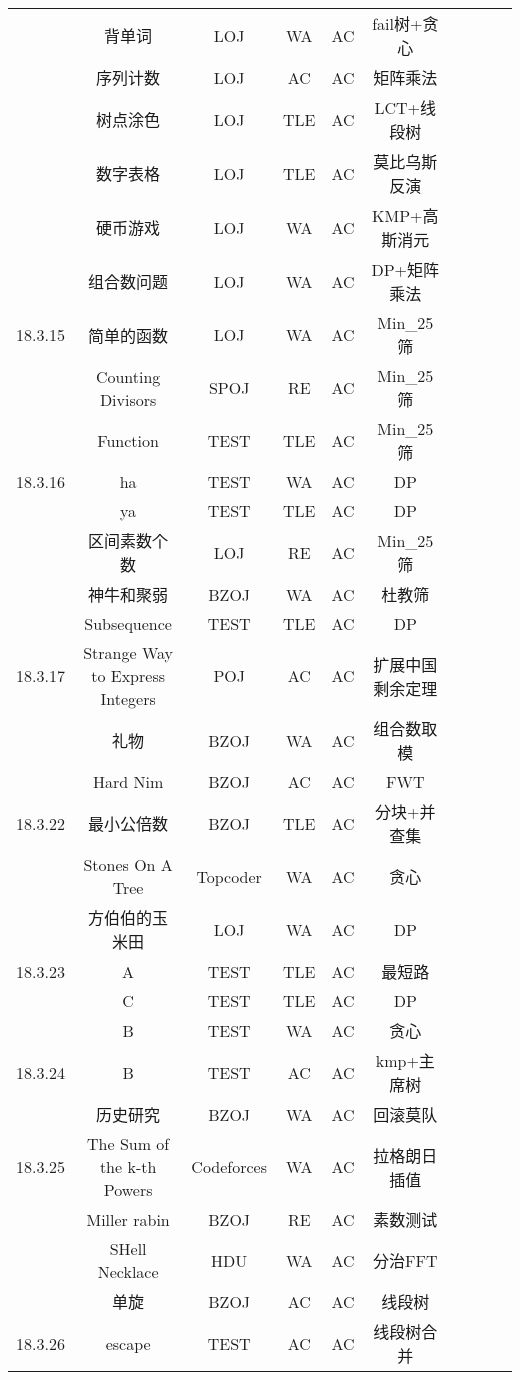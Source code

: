 \documentclass[landscape]{article}
\begin{document}
\begin{longtable}{cccccccccc}
  & 背单词 & LOJ & WA & AC & fail树+贪心\\
  & 序列计数 & LOJ & AC & AC & 矩阵乘法\\
  & 树点涂色 & LOJ & TLE & AC & LCT+线段树\\
  & 数字表格 & LOJ & TLE & AC & 莫比乌斯反演\\
  & 硬币游戏 & LOJ & WA & AC & KMP+高斯消元\\
  & 组合数问题 & LOJ & WA & AC & DP+矩阵乘法\\
  \hline
  18.3.15 & 简单的函数 & LOJ & WA & AC & Min\_25筛\\
  & Counting Divisors & SPOJ & RE & AC & Min\_25筛\\
  & Function & TEST & TLE & AC & Min\_25筛\\
  \hline
  18.3.16 & ha & TEST & WA & AC & DP\\
  & ya & TEST & TLE & AC & DP\\
  & 区间素数个数 & LOJ & RE & AC & Min\_25筛\\
  & 神牛和聚弱 & BZOJ & WA & AC & 杜教筛\\
  & Subsequence & TEST & TLE & AC & DP\\
  \hline
  18.3.17 & Strange Way to Express Integers & POJ & AC & AC & 扩展中国剩余定理\\
  & 礼物 & BZOJ & WA & AC & 组合数取模\\
  & Hard Nim & BZOJ & AC & AC & FWT\\
  \hline
  18.3.22 & 最小公倍数 & BZOJ & TLE & AC & 分块+并查集\\
  & Stones On A Tree & Topcoder & WA & AC & 贪心\\
  & 方伯伯的玉米田 & LOJ & WA & AC & DP\\
  \hline
  18.3.23 & A & TEST & TLE & AC & 最短路\\
  & C & TEST & TLE & AC & DP\\
  & B & TEST & WA & AC & 贪心\\
  \hline
  18.3.24 & B & TEST & AC & AC & kmp+主席树\\
  & 历史研究 & BZOJ & WA & AC & 回滚莫队\\
  \hline
  18.3.25 & The Sum of the k-th Powers & Codeforces &  WA & AC & 拉格朗日插值\\
  & Miller rabin & BZOJ & RE & AC & 素数测试\\
  & SHell Necklace & HDU & WA & AC & 分治FFT\\
  & 单旋 & BZOJ & AC & AC & 线段树\\
  \hline
  18.3.26 & escape & TEST & AC & AC & 线段树合并\\

\end{longtable}
\end{document}
